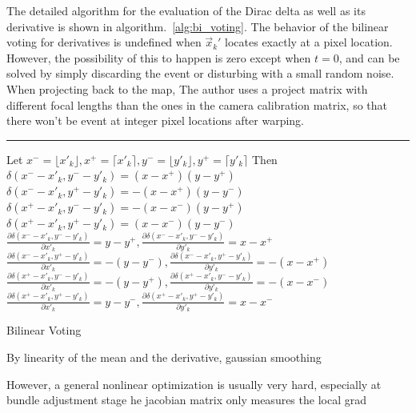 The detailed algorithm for the evaluation of the Dirac delta as well
as its derivative is shown in algorithm.~\ref{alg:bi_voting}. The
behavior of the bilinear voting for derivatives is undefined when
$\vec{x}_k'$ locates exactly at a pixel location. However, the
possibility of this to happen is zero except when $t=0$, and can be
solved by simply discarding the event or disturbing with a small
random noise. When projecting back to the map, The author uses a
project matrix with different focal lengths than the ones in the
camera calibration matrix, so that there won't be event at integer
pixel locations after warping.
\begin{algorithm}
  \label{alg:bi_voting}
  \DontPrintSemicolon \SetAlgoLined {}
    
  \hrule\; Let\;
  $x^-=\lfloor x'_k\rfloor, x^+=\lceil x'_k\rceil,y^-=\lfloor
  y'_k\rfloor, y^+=\lceil y'_k\rceil$\; Then\;
  $\delta(x^--x'_k,y^--y'_k)=(x-x^+)(y-y^+)$\;
  $\delta(x^--x'_k,y^+-y'_k)=-(x-x^+)(y-y^-)$\;
  $\delta(x^+-x'_k,y^--y'_k)=-(x-x^-)(y-y^+)$\;
  $\delta(x^+-x'_k,y^+-y'_k)=(x-x^-)(y-y^-)$\;
  $\frac{\partial\delta(x^--x'_k,y^--y'_k)}{\partial
    x'_k}=y-y^+,\frac{\partial\delta(x^--x'_k,y^--y'_k)}{\partial
    y'_k}=x-x^+$\;
  $\frac{\partial\delta(x^--x'_k,y^+-y'_k)}{\partial
    x'_k}=-(y-y^-),\frac{\partial\delta(x^--x'_k,y^+-y'_k)}{\partial
    y'_k}=-(x-x^+)$\;
  $\frac{\partial\delta(x^+-x'_k,y^--y'_k)}{\partial
    x'_k}=-(y-y^+),\frac{\partial\delta(x^+-x'_k,y^--y'_k)}{\partial
    y'_k}=-(x-x^-)$\;
  $\frac{\partial\delta(x^+-x'_k,y^+-y'_k)}{\partial
    x'_k}=y-y^-,\frac{\partial\delta(x^+-x'_k,y^+-y'_k)}{\partial
    y'_k}=x-x^-$\;
  \caption{Bilinear Voting}
\end{algorithm}
\BlankLine
By linearity of the mean and the derivative, gaussian smoothing

However, a general nonlinear optimization is usually very hard,
especially at bundle adjustment stage he jacobian matrix only measures
the local grad